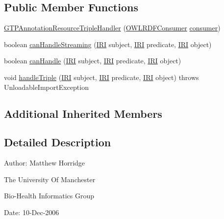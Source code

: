 \subsection*{Public Member Functions}
\begin{DoxyCompactItemize}
\item 
\hyperlink{classorg_1_1coode_1_1owlapi_1_1rdfxml_1_1parser_1_1_g_t_p_annotation_resource_triple_handler_ab7e73d068f532992136cf51f3fa41658}{G\-T\-P\-Annotation\-Resource\-Triple\-Handler} (\hyperlink{classorg_1_1coode_1_1owlapi_1_1rdfxml_1_1parser_1_1_o_w_l_r_d_f_consumer}{O\-W\-L\-R\-D\-F\-Consumer} \hyperlink{classorg_1_1coode_1_1owlapi_1_1rdfxml_1_1parser_1_1_abstract_triple_handler_a4ccf4d898ff01eb1cadfa04b23d54e9c}{consumer})
\item 
boolean \hyperlink{classorg_1_1coode_1_1owlapi_1_1rdfxml_1_1parser_1_1_g_t_p_annotation_resource_triple_handler_aa8fdfe2ab77fecac10e5952011cb5ac0}{can\-Handle\-Streaming} (\hyperlink{classorg_1_1semanticweb_1_1owlapi_1_1model_1_1_i_r_i}{I\-R\-I} subject, \hyperlink{classorg_1_1semanticweb_1_1owlapi_1_1model_1_1_i_r_i}{I\-R\-I} predicate, \hyperlink{classorg_1_1semanticweb_1_1owlapi_1_1model_1_1_i_r_i}{I\-R\-I} object)
\item 
boolean \hyperlink{classorg_1_1coode_1_1owlapi_1_1rdfxml_1_1parser_1_1_g_t_p_annotation_resource_triple_handler_af97b4b8a3a24a35d2318d48e952807fe}{can\-Handle} (\hyperlink{classorg_1_1semanticweb_1_1owlapi_1_1model_1_1_i_r_i}{I\-R\-I} subject, \hyperlink{classorg_1_1semanticweb_1_1owlapi_1_1model_1_1_i_r_i}{I\-R\-I} predicate, \hyperlink{classorg_1_1semanticweb_1_1owlapi_1_1model_1_1_i_r_i}{I\-R\-I} object)
\item 
void \hyperlink{classorg_1_1coode_1_1owlapi_1_1rdfxml_1_1parser_1_1_g_t_p_annotation_resource_triple_handler_a659c929459deebbf8f88239a2e5c659b}{handle\-Triple} (\hyperlink{classorg_1_1semanticweb_1_1owlapi_1_1model_1_1_i_r_i}{I\-R\-I} subject, \hyperlink{classorg_1_1semanticweb_1_1owlapi_1_1model_1_1_i_r_i}{I\-R\-I} predicate, \hyperlink{classorg_1_1semanticweb_1_1owlapi_1_1model_1_1_i_r_i}{I\-R\-I} object)  throws Unloadable\-Import\-Exception 
\end{DoxyCompactItemize}
\subsection*{Additional Inherited Members}


\subsection{Detailed Description}
Author\-: Matthew Horridge\par
 The University Of Manchester\par
 Bio-\/\-Health Informatics Group\par
 Date\-: 10-\/\-Dec-\/2006\par
\par
 

